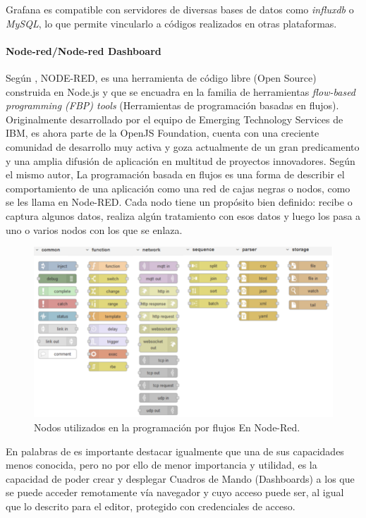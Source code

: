Grafana es compatible con servidores de diversas bases de datos como \textit{influxdb} o \textit{MySQL}, lo que permite vincularlo a códigos realizados en otras plataformas.

\paragraph{Node-red/Node-red Dashboard}

Según \cite{sancho2020}, NODE-RED, es una herramienta de código libre (Open Source) construida en Node.js y que se encuadra en la familia de herramientas \textit{flow-based programming (FBP) tools} (Herramientas de programación basadas en flujos). Originalmente desarrollado por el equipo de Emerging Technology Services de IBM, es ahora parte de la OpenJS Foundation, cuenta con una creciente comunidad de desarrollo muy activa y goza actualmente de un gran predicamento y una amplia difusión de aplicación en multitud de proyectos innovadores. Según el mismo autor, La programación basada en flujos es una forma de describir el comportamiento de una aplicación como una red de cajas negras o nodos, como se les llama en Node-RED. Cada nodo tiene un propósito bien definido: recibe o captura algunos datos, realiza algún tratamiento con esos datos y luego los pasa a uno o varios nodos con los que se enlaza.

\begin{figure}[H]
\centering
\includegraphics[scale=0.6]{images/nodered.png}
\caption{Nodos utilizados en la programación por flujos En Node-Red.}
\end{figure}

En palabras de \cite{sancho2020} es importante destacar igualmente que una de sus capacidades menos conocida, pero no por ello de menor importancia y utilidad, es la capacidad de poder crear y desplegar Cuadros de Mando (Dashboards) a los que se puede acceder remotamente vía navegador y cuyo acceso puede ser, al igual que lo descrito para el editor, protegido con credenciales de acceso.

